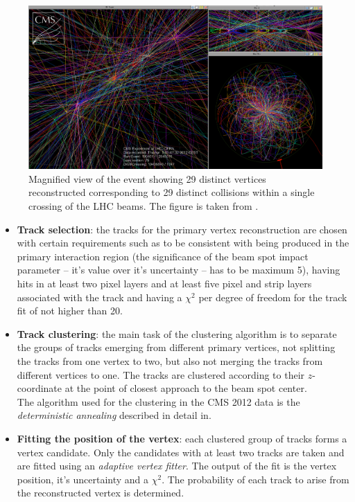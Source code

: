 \begin{figure}[t]
  \centering
  \includegraphics[width=1.0\textwidth]{04_event_reconstruction/plots/url.png}
  \caption{Magnified view of the event showing 29 distinct vertices reconstructed corresponding to 29 distinct collisions within a single crossing of the LHC beams. The figure
  is taken from \cite{MultipleVert}.}
  \label{fig:HugePU}
\end{figure}
\begin{itemize}

 \item \textbf{Track selection}: the tracks for the primary vertex reconstruction are chosen with certain requirements such as to be consistent with being produced 
 in the primary interaction region (the significance of the beam spot impact parameter -- it's value over it's uncertainty -- has to be maximum 5), having hits in at least two pixel 
 layers and at least five pixel and strip layers associated with the track and having a $\chi^{2}$ per degree of freedom for the track fit of not higher than 20.
 \item \textbf{Track clustering}: the main task of the clustering algorithm is to separate the groups of tracks emerging from different primary vertices, not splitting 
 the tracks from one vertex to two, but also not merging the tracks from different vertices to one. The tracks are clustered according 
 to their $z$-coordinate at the point of closest approach to the beam spot center. 
 \\
 The algorithm used for the clustering in the CMS 2012 data is the \textit{deterministic annealing} described in detail in\cite{rose_ieee1998}. 
 \item \textbf{Fitting the position of the vertex}: each clustered group of tracks forms a vertex candidate. Only the candidates with at least two tracks are taken and are fitted
 using an \textit{adaptive vertex fitter}\cite{Frühwirth:1027031}. The output of the fit is the vertex position, it's uncertainty and a $\chi^{2}$. The probability
 of each track to arise from the reconstructed vertex is determined.
\end{itemize}

